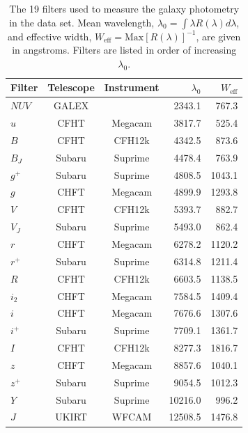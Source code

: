 \begin{table}
    \centering
    \caption{The 19 filters used to measure the galaxy photometry in the data set. Mean wavelength, $\lambda_0 = \int \lambda R(\lambda) d\lambda$, and effective width, $W_\text{eff} = \text{Max}[R(\lambda)]^{-1}$, are given in angstroms. Filters are listed in order of increasing $\lambda_0$.}
    \begin{tabular}{l c c r r}
        \hline \hline
        Filter & Telescope & Instrument & $\lambda_0$ & $W_\text{eff}$ \\
        \hline
        
        $NUV$ & GALEX  &         &  2343.1 &  767.3 \\
        $u$   & CFHT   & Megacam &  3817.7 &  525.4 \\
        $B$   & CFHT   & CFH12k  &  4342.5 &  873.6 \\
        $B_J$ & Subaru & Suprime &  4478.4 &  763.9 \\
        $g^+$ & Subaru & Suprime &  4808.5 & 1043.1 \\
        $g$   & CHFT   & Megacam &  4899.9 & 1293.8 \\
        $V$   & CFHT   & CFH12k  &  5393.7 &  882.7 \\
        $V_J$ & Subaru & Suprime &  5493.0 &  862.4 \\
        $r$   & CHFT   & Megacam &  6278.2 & 1120.2 \\
        $r^+$ & Subaru & Suprime &  6314.8 & 1211.4 \\
        $R$   & CFHT   & CFH12k  &  6603.5 & 1138.5 \\
        $i_2$ & CHFT   & Megacam &  7584.5 & 1409.4 \\
        $i$   & CHFT   & Megacam &  7676.6 & 1307.6 \\
        $i^+$ & Subaru & Suprime &  7709.1 & 1361.7 \\
        $I$   & CFHT   & CFH12k  &  8277.3 & 1816.7 \\
        $z$   & CHFT   & Megacam &  8857.6 & 1040.1 \\
        $z^+$ & Subaru & Suprime &  9054.5 & 1012.3 \\
        $Y$   & Subaru & Suprime & 10216.0 &  996.2 \\
        $J$   & UKIRT  & WFCAM   & 12508.5 & 1476.8 \\
        
        \hline
    \end{tabular}
    \label{tab:filters}
\end{table}

